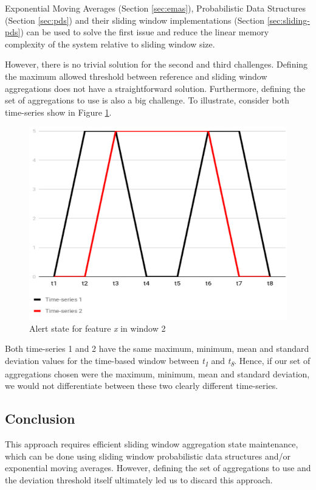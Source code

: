Exponential Moving Averages (Section \ref{sec:emas}), Probabilistic Data Structures (Section \ref{sec:pds}) and their sliding window implementations (Section \ref{sec:sliding-pds}) can be used to solve the first issue and reduce the linear memory complexity of the system relative to sliding window size. 

However, there is no trivial solution for the second and third challenges. Defining the maximum allowed threshold between reference and sliding window aggregations does not have a straightforward solution. Furthermore, defining the set of aggregations to use is also a big challenge. To illustrate, consider both time-series show in Figure \ref{fig:approach2-timeseries}.
 
\begin{figure}[!htb]
    \begin{center}
      \includegraphics[scale=0.65]{figures/approach2-timeseries.png}
      \caption[]{Alert state for feature \textit{x} in window 2}
      \label{fig:approach2-timeseries}
    \end{center}
\end{figure}


Both time-series 1 and 2 have the same maximum, minimum, mean and standard deviation values for the time-based window between \textit{t\textsubscript{1}} and \textit{t\textsubscript{8}}. Hence, if our set of aggregations chosen were the maximum, minimum, mean and standard deviation, we would not differentiate between these two clearly different time-series.

\subsection*{Conclusion}
This approach requires efficient sliding window aggregation state maintenance, which can be done using sliding window probabilistic data structures and/or exponential moving averages. However, defining the set of aggregations to use and the deviation threshold itself ultimately led us to discard this approach.


